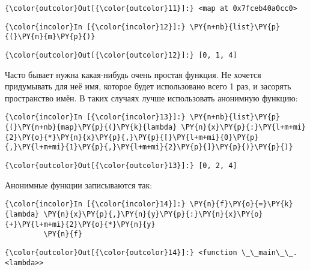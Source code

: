 \begin{Verbatim}[commandchars=\\\{\}]
{\color{outcolor}Out[{\color{outcolor}11}]:} <map at 0x7fceb40a0cc0>
\end{Verbatim}
            
    \begin{Verbatim}[commandchars=\\\{\}]
{\color{incolor}In [{\color{incolor}12}]:} \PY{n+nb}{list}\PY{p}{(}\PY{n}{m}\PY{p}{)}
\end{Verbatim}


\begin{Verbatim}[commandchars=\\\{\}]
{\color{outcolor}Out[{\color{outcolor}12}]:} [0, 1, 4]
\end{Verbatim}
            
    Часто бывает нужна какая-нибудь очень простая функция. Не хочется
придумывать для неё имя, которое будет использовано всего 1 раз, и
засорять пространство имён. В таких случаях лучше использовать анонимную
функцию:

    \begin{Verbatim}[commandchars=\\\{\}]
{\color{incolor}In [{\color{incolor}13}]:} \PY{n+nb}{list}\PY{p}{(}\PY{n+nb}{map}\PY{p}{(}\PY{k}{lambda} \PY{n}{x}\PY{p}{:}\PY{l+m+mi}{2}\PY{o}{*}\PY{n}{x}\PY{p}{,}\PY{p}{[}\PY{l+m+mi}{0}\PY{p}{,}\PY{l+m+mi}{1}\PY{p}{,}\PY{l+m+mi}{2}\PY{p}{]}\PY{p}{)}\PY{p}{)}
\end{Verbatim}


\begin{Verbatim}[commandchars=\\\{\}]
{\color{outcolor}Out[{\color{outcolor}13}]:} [0, 2, 4]
\end{Verbatim}
            
    Анонимные функции записываются так:

    \begin{Verbatim}[commandchars=\\\{\}]
{\color{incolor}In [{\color{incolor}14}]:} \PY{n}{f}\PY{o}{=}\PY{k}{lambda} \PY{n}{x}\PY{p}{,}\PY{n}{y}\PY{p}{:}\PY{n}{x}\PY{o}{+}\PY{l+m+mi}{2}\PY{o}{*}\PY{n}{y}
         \PY{n}{f}
\end{Verbatim}


\begin{Verbatim}[commandchars=\\\{\}]
{\color{outcolor}Out[{\color{outcolor}14}]:} <function \_\_main\_\_.<lambda>>
\end{Verbatim}
            
